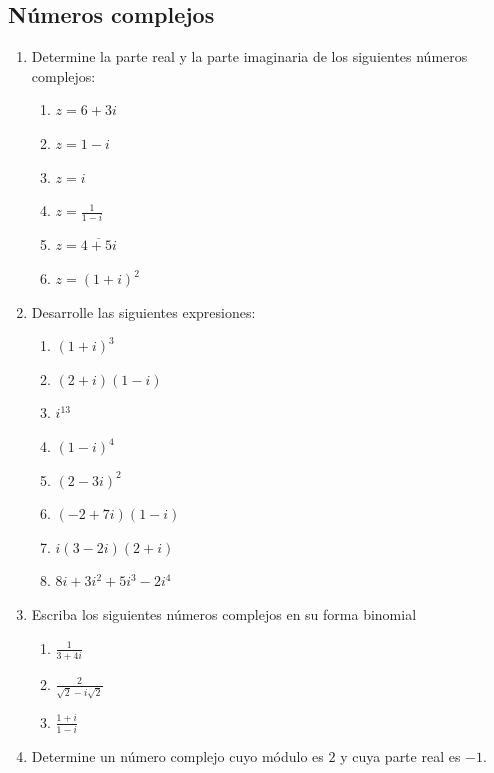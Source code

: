\documentclass[11pt, twoside]{book}%
\begin{document}
\subsection*{Números complejos}
\begin{enumerate}
    \item Determine la parte real y la parte imaginaria de los siguientes números complejos:
        \begin{multicols}{2}
        \begin{enumerate}
            \item \(z=6+3i\)
            \item \(z=1-i\)
            \item \(z=i\)
            \item \(z=\frac{1}{1-i}\)
            \item \(z=\overline{4+5i}\)
            \item \(z=(1+i)^2\)
        \end{enumerate}
    \end{multicols}
    \item Desarrolle las siguientes expresiones:
        \begin{multicols}{2}
        \begin{enumerate}
            \item \((1+i)^3\)
            \item \((2+i)(1-i)\)
            \item \(i^{13}\)
            \item \((1-i)^4\)
            \item \((2-3i)^2\)
            \item \((-2+7i)(1-i)\)
            \item \(i(3-2i)(2+i)\)
            \item \(8i+3i^2+5i^3-2i^4\)
        \end{enumerate}
    \end{multicols}
    \item Escriba los siguientes números complejos en su forma binomial
        \begin{enumerate}
            \item \(\frac{1}{3+4i}\)
            \item \(\frac{2}{\sqrt{2}-i\sqrt{2}}\)
            \item \(\frac{1+i}{1-i}\)
        \end{enumerate}
    \item Determine un número complejo cuyo módulo es \(2\) y cuya parte real es \(-1\).
\end{enumerate}
\end{document}
